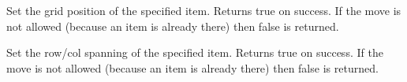 
Set the grid position of the specified item.  Returns true on success.
If the move is not allowed (because an item is already there) then
false is returned.  



\label{wxgridbagsizersetitemspan}




Set the row/col spanning of the specified item. Returns true on
success.  If the move is not allowed (because an item is already there)
then false is returned.



